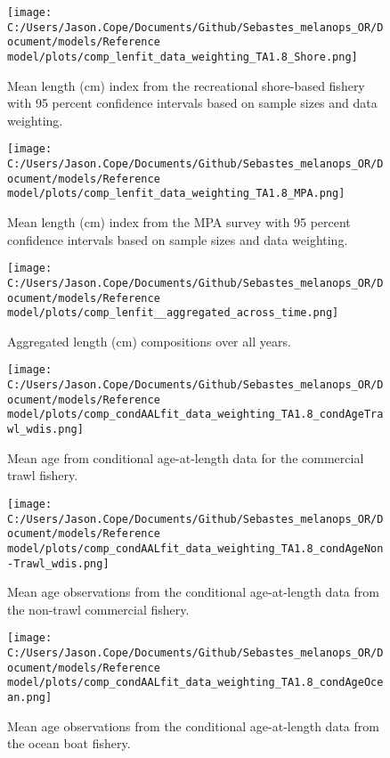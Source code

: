 \documentclass[11pt,
  english,
  letterpaper,
]{article}
\begin{document}
\begin{figure}
\centering
\texttt{[image: C:/Users/Jason.Cope/Documents/Github/Sebastes\_melanops\_OR/Document/models/Reference model/plots/comp\_lenfit\_data\_weighting\_TA1.8\_Shore.png]}
\caption{Mean length (cm) index from the recreational shore-based fishery with 95 percent confidence intervals based on sample sizes and data weighting.\label{fig:shore-mean-len-fit}}
\end{figure}

\begin{figure}
\centering
\texttt{[image: C:/Users/Jason.Cope/Documents/Github/Sebastes\_melanops\_OR/Document/models/Reference model/plots/comp\_lenfit\_data\_weighting\_TA1.8\_MPA.png]}
\caption{Mean length (cm) index from the MPA survey with 95 percent confidence intervals based on sample sizes and data weighting.\label{fig:mpa-mean-len-fit}}
\end{figure}

\begin{figure}
\centering
\texttt{[image: C:/Users/Jason.Cope/Documents/Github/Sebastes\_melanops\_OR/Document/models/Reference model/plots/comp\_lenfit\_\_aggregated\_across\_time.png]}
\caption{Aggregated length (cm) compositions over all years.\label{fig:agg-len-fit}}
\end{figure}

\begin{figure}
\centering
\texttt{[image: C:/Users/Jason.Cope/Documents/Github/Sebastes\_melanops\_OR/Document/models/Reference model/plots/comp\_condAALfit\_data\_weighting\_TA1.8\_condAgeTrawl\_wdis.png]}
\caption{Mean age from conditional age-at-length data for the commercial trawl fishery.\label{fig:trawl-mean-caal}}
\end{figure}

\begin{figure}
\centering
\texttt{[image: C:/Users/Jason.Cope/Documents/Github/Sebastes\_melanops\_OR/Document/models/Reference model/plots/comp\_condAALfit\_data\_weighting\_TA1.8\_condAgeNon-Trawl\_wdis.png]}
\caption{Mean age observations from the conditional age-at-length data from the non-trawl commercial fishery.\label{fig:nontrawl-mean-caal}}
\end{figure}

\begin{figure}
\centering
\texttt{[image: C:/Users/Jason.Cope/Documents/Github/Sebastes\_melanops\_OR/Document/models/Reference model/plots/comp\_condAALfit\_data\_weighting\_TA1.8\_condAgeOcean.png]}
\caption{Mean age observations from the conditional age-at-length data from the ocean boat fishery.\label{fig:ocean-mean-caal}}
\end{figure}
\end{document}
